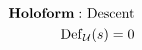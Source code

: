 \documentclass[preview]{standalone}
\begin{document}
\begin{align*}
\special{dvisvgm:raw <g id='unique000'>}\mathbf{Holoform:}\text{ Descent}\\\operatorname{Def}_{\mathcal{U}}(s)=0\special{dvisvgm:raw </g>}
\end{align*}
\end{document}
